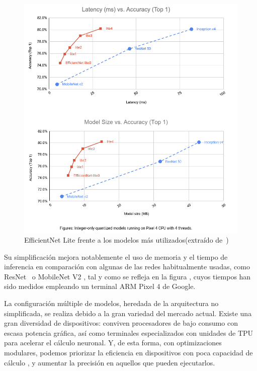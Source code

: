 \begin{figure}[H]

	\centering
	\includegraphics[scale = 0.325]{imagenes/eflite.png}
	\caption{EfficientNet Lite frente a los modelos más utilizados(extraído de~\cite{eflite2})}
		\label{eflite}
\end{figure}

Su simplificación mejora notablemente el uso de memoria y el tiempo de inferencia en comparación con algunas de las redes habitualmente usadas, como ResNet~\cite{DBLP:journals/corr/HeZRS15} o MobileNet V2 \cite{sandler2019mobilenetv2}, tal y como se refleja en la figura \cite{eflite}, cuyos tiempos han sido medidos empleando un terminal ARM Pixel 4 de Google.

La configuración múltiple de modelos, heredada de la arquitectura no simplificada, se realiza debido a la gran variedad del mercado actual. Existe una gran diversidad de  dispositivos: conviven procesadores de bajo consumo con escasa potencia gráfica, así como terminales especializados con unidades de TPU para acelerar el cálculo neuronal. Y, de esta forma, con optimizaciones modulares, podemos priorizar la eficiencia en dispositivos con poca capacidad de cálculo , y aumentar la precisión en aquellos que pueden ejecutarlos.

